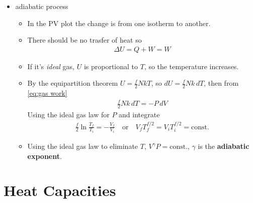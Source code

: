 \documentclass{book}
\begin{document}
\begin{itemize}
  \item adiabatic process
        \begin{itemize}
          \item In the PV plot the change is from one isotherm to another.
          \item There should be no trasfer of heat so
                \begin{align}
                  \Delta{U} = Q+W = W
                \end{align}
          \item If it's \textit{ideal} gas, $U$ is proportional to $T$, so the
                temperature increases.
          \item By the equipartition theorem $U = \frac{f}{2} NkT$, so $dU = \frac{f}{2} Nk\, dT$,
                then from \eqref{eq:gas work}
                \begin{align}
                  \frac{f}{2} Nk \, dT = -P\, dV
                \end{align}
                Using the ideal gas law for $P$ and integrate
                \begin{align}
                  \frac{f}{2} \ln{\frac{T_{f}}{T_{i}}} = - {\frac{V_{f}}{V_{i}}} \quad \text{or} \quad
                  V_{f} T_{f}^{f/2} = V_{i} T_{i}^{f/2} = \text{const.}
                \end{align}
          \item Using the ideal gas law to eliminate $T$, $V^{\gamma}P = \text{const.}$,
                $\gamma$ is the \textbf{adiabatic exponent}.
        \end{itemize}
\end{itemize}


\section{Heat Capacities}%
\label{sec:Heat Capacities}
\end{document}
